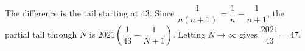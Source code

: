 The difference is the tail starting at 43. Since $\dfrac{1}{n(n+1)}=\dfrac{1}{n}-\dfrac{1}{n+1}$, the partial tail through $N$ is $2021(\dfrac{1}{43}-\dfrac{1}{N+1})$. Letting $N\to\infty$ gives $\dfrac{2021}{43}=\boxed{47}$.
